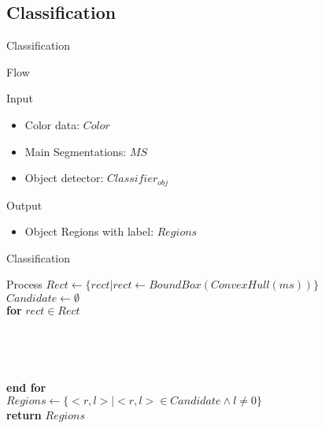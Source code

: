 \documentclass[xcolor=table,compress,blue]{beamer}
\begin{document}
\subsection{Classification}
\begin{frame}{Classification}
	\begin{exampleblock}{Flow}
	\end{exampleblock}
	\begin{exampleblock}{Input}
		\begin{itemize}		
			\item Color data: $Color$	
			\item Main Segmentations: $MS$ 
			\item Object detector: ${Classifier}_{obj}$
		\end{itemize}
	\end{exampleblock}
	\begin{exampleblock}{Output}
		\begin{itemize}
			\item Object Regions with label: $Regions$
		\end{itemize}
	\end{exampleblock}
\end{frame}

\begin{frame}{Classification}
	\begin{exampleblock}{Process}
		{$Rect \leftarrow \{rect|rect \leftarrow BoundBox(ConvexHull(ms))\}$}
		\\ {$Candidate \leftarrow \emptyset$}
		\\ \textbf{for} {$rect \in Rect$}
		\\ 
		\\ 
		\\ 
		\\ 
		\\ \textbf{end for}
		\\ {$Regions \leftarrow \{<r,l>|<r,l> \in Candidate \wedge l \neq 0\}$}
		\\ \textbf{return} $Regions$
	\end{exampleblock}
\end{frame}
\end{document}
